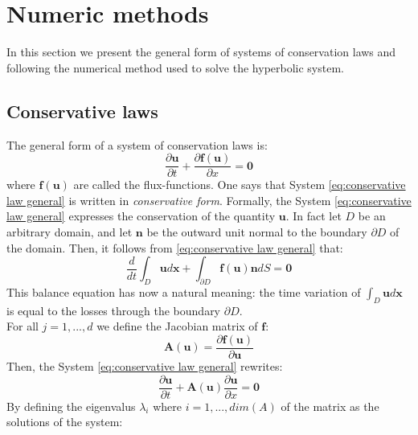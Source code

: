 \documentclass[12pt,a4paper]{article}
\numberwithin{equation}{section}
\begin{document}
\newpage 
\section{Numeric methods}
\label{sec:numerical}
In this section we present the general form of systems of conservation laws and following the numerical method used to solve the hyperbolic system. 

\subsection{Conservative laws}
The general form of a system of conservation laws is:
\begin{equation} \label{eq:conservative law general}
\frac{\partial \boldsymbol{u}}{\partial t} +  \frac{\partial \boldsymbol{f}(\boldsymbol{u})}{\partial x}  = \boldsymbol{0}
\end{equation}
where $\boldsymbol{f}(\boldsymbol{u})$ are called the flux-functions. One says that System \ref{eq:conservative law general} is written in \textit{conservative form}.
Formally, the System \ref{eq:conservative law general} expresses the conservation of the quantity $\boldsymbol{u}$. In fact let $D$ be an arbitrary domain, and let $\boldsymbol{n}$ be the outward unit normal to the boundary $\partial D$ of the domain. Then, it follows from \ref{eq:conservative law general} that:
\begin{equation}
\frac{d}{dt} \int_D \boldsymbol{u}d\boldsymbol{x} + \int_{\partial D} \boldsymbol{f}(\boldsymbol{u})\boldsymbol{n} dS = \boldsymbol{0}
\end{equation}
This balance equation has now a natural meaning: the time variation of $\int_D \boldsymbol{u}d\boldsymbol{x}$ is equal to the losses through the boundary $\partial D$.\\
For all $j = 1,...,d$ we define the Jacobian matrix of $\boldsymbol{f}$:
\begin{equation}\label{eq:matrix}
\boldsymbol{A}(\boldsymbol{u}) = \frac{\partial \boldsymbol f(\boldsymbol{u})}{\partial \boldsymbol{u}}
\end{equation}
Then, the System \ref{eq:conservative law general} rewrites:
\begin{equation} \label{eq:hyperbolic}
\frac{\partial \boldsymbol{u}}{\partial t} +  \boldsymbol{A}(\boldsymbol{u}) \frac{\partial\boldsymbol{u}}{\partial x}  = \boldsymbol{0}
\end{equation}
By defining the eigenvalus $\lambda_i$ where $i = 1,...,dim(A)$ of the matrix as the solutions of the system:
\end{document}
